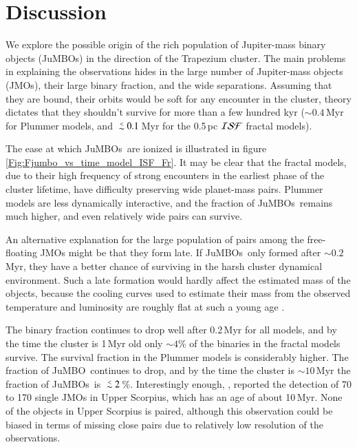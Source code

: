 \documentclass[submission,phys]{lib/SciPost}
\def\aplt{\ {\raise-.5ex\hbox{$\buildrel<\over\sim$}}\ }
\newcommand{\jumbo}{\mbox{JuMBO}}
\newcommand{\jumbos}{\mbox{JuMBOs}}
\begin{document}
\section{Discussion}\label{Sect:Discussion}

We explore the possible origin of the rich population of Jupiter-mass
binary objects (\jumbos) in the direction of the Trapezium cluster.
The main problems in explaining the observations hides in the large
number of Jupiter-mass objects (JMOs), their large binary fraction, and the
wide separations. Assuming that they are bound, their orbits would be
soft for any encounter in the cluster, theory dictates that they shouldn't
survive for more than a few hundred kyr ($\sim 0.4$\,Myr for Plummer
models, and $\aplt 0.1$\,Myr for the 0.5\,pc ${\cal ISF}$ fractal
models).

The ease at which \jumbos\, are ionized is illustrated in
figure\,\ref{Fig:Fjumbo_vs_time_model_ISF_Fr}. It may be clear that
the fractal models, due to their high frequency of strong encounters
in the earliest phase of the cluster lifetime, have difficulty preserving wide
planet-mass pairs. Plummer models are less dynamically interactive,
and the fraction of \jumbos\, remains much higher, and even relatively
wide pairs can survive.

An alternative explanation for the large population of pairs among the
free-floating JMOs might be that they form late.  If \jumbos\, only
formed after $\sim 0.2$\,Myr, they have a better chance of surviving in
the harsh cluster dynamical environment.  Such a late formation would
hardly affect the estimated mass of the objects, because the cooling
curves used to estimate their mass from the observed temperature and
luminosity are roughly flat at such a young age
\cite{2000MNRAS.314..858L}.

The binary fraction continues to drop well after 0.2\,Myr for all
models, and by the time the cluster is 1\,Myr old only $\sim 4$\% of the
binaries in the fractal models survive. The survival fraction in the
Plummer models is considerably higher. The fraction of \jumbo\,
continues to drop, and by the time the cluster is $\sim 10$\,Myr the
fraction of \jumbos\ is $\aplt 2$\,\%.  Interestingly enough,
\cite{2022NatAs...6...89M}, reported the detection of 70 to 170 single
JMOs in Upper Scorpius, which has an age of about 10\,Myr.  None of
the objects in Upper Scorpius is paired, although this observation
could be biased in terms of missing close pairs due to relatively low
resolution of the observations.
\end{document}
